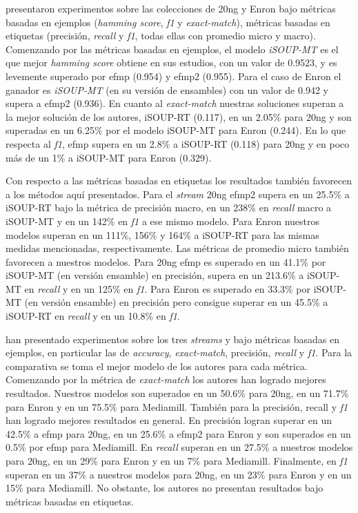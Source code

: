\citeauthor{osojnik_multi-label_2017} presentaron experimentos sobre las
colecciones de 20ng y Enron bajo métricas basadas en ejemplos (\textit{hamming
	score}, \textit{f1} y \textit{exact-match}), métricas basadas en etiquetas
(precisión, \textit{recall} y \textit{f1}, todas ellas con promedio micro y
macro). Comenzando por las métricas basadas en ejemplos, el modelo
\textit{iSOUP-MT} es el que mejor \textit{hamming score} obtiene en sus
estudios, con un valor de 0.9523, y es levemente superado por \acrshort{efmp}
(0.954) y \acrshort{efmp2} (0.955). Para el caso de Enron el ganador es
\textit{iSOUP-MT} (en su versión de ensambles) con un valor de 0.942 y supera a
\acrshort{efmp2} (0.936). En cuanto al \textit{exact-match} nuestras soluciones
superan a la mejor solución de los autores, iSOUP-RT (0.117), en un 2.05\% para
20ng y son superadas en un 6.25\% por el modelo iSOUP-MT para Enron (0.244). En
lo que respecta al \textit{f1}, \acrshort{efmp} supera en un 2.8\% a iSOUP-RT
(0.118) para 20ng y en poco más de un 1\% a iSOUP-MT para Enron (0.329).

Con respecto a las métricas basadas en etiquetas los resultados también
favorecen a los métodos aquí presentados. Para el \textit{stream} 20ng
\acrshort{efmp2} supera en un 25.5\% a iSOUP-RT bajo la métrica de precisión
macro, en un 238\% en \textit{recall} macro a iSOUP-MT y en un 142\% en
\textit{f1} a ese mismo modelo. Para Enron nuestros modelos superan en un 111\%,
156\% y 164\% a iSOUP-RT para las mismas medidas mencionadas, respectivamente.
Las métricas de promedio micro también favorecen a nuestros modelos. Para 20ng
\acrshort{efmp} es superado en un 41.1\% por iSOUP-MT (en versión ensamble) en
precisión, supera en un 213.6\% a iSOUP-MT en \textit{recall} y en un 125\% en
\textit{f1}. Para Enron es superado en 33.3\% por iSOUP-MT (en versión ensamble)
en precisión pero consigue superar en un 45.5\% a iSOUP-RT en \textit{recall} y
en un 10.8\% en \textit{f1}.

\citeauthor{sousa_multi-label_2018} han presentado experimentos sobre los tres
\textit{streams} y bajo métricas basadas en ejemplos, en particular las de
\textit{accuracy}, \textit{exact-match}, precisión, \textit{recall} y
\textit{f1}. Para la comparativa se toma el mejor modelo de los autores para
cada métrica. Comenzando por la métrica de \textit{exact-match} los autores han
logrado mejores resultados. Nuestros modelos son superados en un 50.6\% para
20ng, en un 71.7\% para Enron y en un 75.5\% para Mediamill. También para la
precisión, recall y \textit{f1} \citeauthor{sousa_multi-label_2018} han logrado
mejores resultados en general.  En precisión logran superar en un 42.5\% a
\acrshort{efmp} para 20ng, en un 25.6\% a \acrshort{efmp2} para Enron y son
superados en un 0.5\% por \acrshort{efmp} para Mediamill. En \textit{recall}
superan en un 27.5\% a nuestros modelos para 20ng, en un 29\% para Enron y en un
7\% para Mediamill.  Finalmente, en \textit{f1} superan en un 37\% a nuestros
modelos para 20ng, en un 23\% para Enron y en un 15\% para Mediamill. No
obstante, los autores no presentan resultados bajo métricas basadas en
etiquetas.

